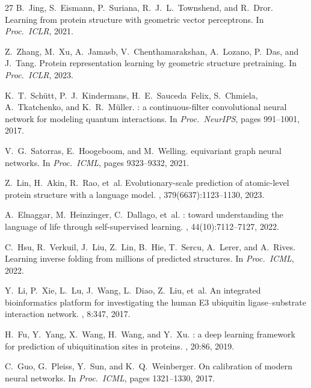 \documentclass[sigconf]{acmart}
\begin{document}
\begin{thebibliography}{27}
B.~Jing, S.~Eismann, P.~Suriana, R.~J.~L.~Townshend, and R.~Dror.
\newblock Learning from protein structure with geometric vector perceptrons.
\newblock In {\em Proc.\ ICLR}, 2021.

Z.~Zhang, M.~Xu, A.~Jamasb, V.~Chenthamarakshan, A.~Lozano, P.~Das, and J.~Tang.
\newblock Protein representation learning by geometric structure pretraining.
\newblock In {\em Proc.\ ICLR}, 2023.

K.~T.~Sch\"{u}tt, P.~J.~Kindermans, H.~E.~Sauceda~Felix, S.~Chmiela, A.~Tkatchenko, and K.~R.~M\"{u}ller.
: a continuous-filter convolutional neural network for modeling quantum interactions.
\newblock In {\em Proc.\ NeurIPS}, pages 991--1001, 2017.

V.~G.~Satorras, E.~Hoogeboom, and M.~Welling.
 equivariant graph neural networks.
\newblock In {\em Proc.\ ICML}, pages 9323--9332, 2021.

Z.~Lin, H.~Akin, R.~Rao, et~al.
\newblock Evolutionary-scale prediction of atomic-level protein structure with a language model.
, 379(6637):1123--1130, 2023.

A.~Elnaggar, M.~Heinzinger, C.~Dallago, et~al.
: toward understanding the language of life through self-supervised learning.
, 44(10):7112--7127, 2022.

C.~Hsu, R.~Verkuil, J.~Liu, Z.~Lin, B.~Hie, T.~Sercu, A.~Lerer, and A.~Rives.
\newblock Learning inverse folding from millions of predicted structures.
\newblock In {\em Proc.\ ICML}, 2022.

Y.~Li, P.~Xie, L.~Lu, J.~Wang, L.~Diao, Z.~Liu, et~al.
\newblock An integrated bioinformatics platform for investigating the human {E3} ubiquitin ligase--substrate interaction network.
, 8:347, 2017.

H.~Fu, Y.~Yang, X.~Wang, H.~Wang, and Y.~Xu.
: a deep learning framework for prediction of ubiquitination sites in proteins.
, 20:86, 2019.

C.~Guo, G.~Pleiss, Y.~Sun, and K.~Q.~Weinberger.
\newblock On calibration of modern neural networks.
\newblock In {\em Proc.\ ICML}, pages 1321--1330, 2017.


\end{thebibliography}
\end{document}
